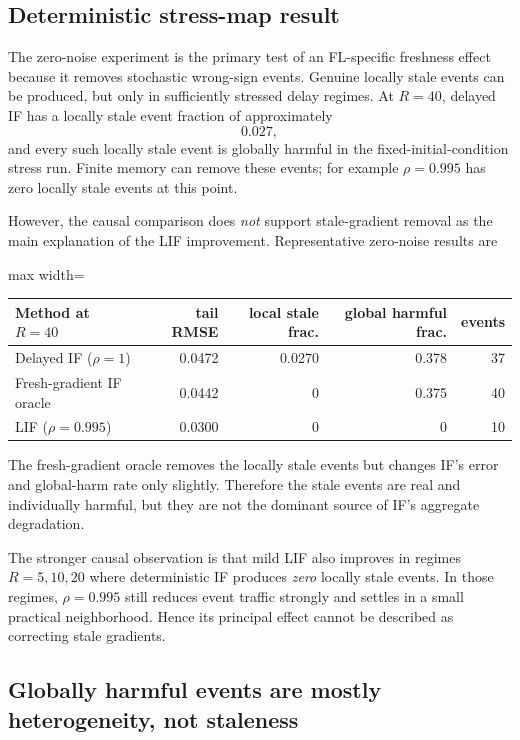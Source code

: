 \subsection{Deterministic stress-map result}

The zero-noise experiment is the primary test of an FL-specific freshness effect because it removes stochastic wrong-sign events. Genuine locally stale events can be produced, but only in sufficiently stressed delay regimes. At $R=40$, delayed IF has a locally stale event fraction of approximately
\begin{equation}
  0.027,
\end{equation}
and every such locally stale event is globally harmful in the fixed-initial-condition stress run. Finite memory can remove these events; for example $\rho=0.995$ has zero locally stale events at this point.

However, the causal comparison does \emph{not} support stale-gradient removal as the main explanation of the LIF improvement. Representative zero-noise results are
\begin{center}
\begin{adjustbox}{max width=\textwidth}
\begin{tabular}{lrrrr}
\toprule
Method at $R=40$ & tail RMSE & local stale frac. & global harmful frac. & events \\
\midrule
Delayed IF ($\rho=1$) & 0.0472 & 0.0270 & 0.378 & 37 \\
Fresh-gradient IF oracle & 0.0442 & 0 & 0.375 & 40 \\
LIF ($\rho=0.995$) & 0.0300 & 0 & 0 & 10 \\
\bottomrule
\end{tabular}
\end{adjustbox}
\end{center}
The fresh-gradient oracle removes the locally stale events but changes IF's error and global-harm rate only slightly. Therefore the stale events are real and individually harmful, but they are not the dominant source of IF's aggregate degradation.

The stronger causal observation is that mild LIF also improves in regimes $R=5,10,20$ where deterministic IF produces \emph{zero} locally stale events. In those regimes, $\rho=0.995$ still reduces event traffic strongly and settles in a small practical neighborhood. Hence its principal effect cannot be described as correcting stale gradients.

\subsection{Globally harmful events are mostly heterogeneity, not staleness}


